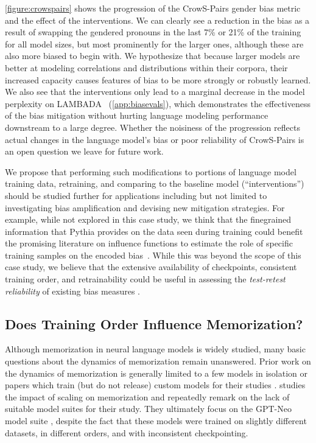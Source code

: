 \documentclass{article}
\theoremstyle{plain}
\theoremstyle{definition}
\theoremstyle{remark}
\begin{document}
\cref{figure:crowspairs} shows the progression of the CrowS-Pairs gender bias metric and the effect of the interventions. We can clearly see a reduction in the bias as a result of swapping the gendered pronouns in the last 7\% or 21\% of the training for all model sizes, but most prominently for the larger ones, although these are also more biased to begin with. We hypothesize that because larger models are better at modeling correlations and distributions within their corpora, their increased capacity causes features of bias to be more strongly or robustly learned.
We also see that the interventions only lead to a marginal decrease in the model perplexity on LAMBADA~\citep{paperno2016lambada} (\cref{app:biasevals}), which demonstrates the effectiveness of the bias mitigation without hurting language modeling performance downstream to a large degree.
Whether the noisiness of the progression reflects actual changes in the language model's bias or poor reliability of CrowS-Pairs is an open question we leave for future work.



We propose that performing such modifications to portions of language model training data, retraining, and comparing to the baseline model (``interventions'') should be studied further for applications including but not limited to investigating bias amplification and devising new mitigation strategies.
For example, while not explored in this case study, we think that the finegrained information that Pythia provides on the data seen during training could benefit the promising literature on influence functions to estimate the role of specific training samples on the encoded bias~\citep{brunet2019understanding,silva2022cross}.
While this was beyond the scope of this case study, we believe that the extensive availability of checkpoints, consistent training order, and retrainability could be useful in assessing the \textit{test-retest reliability} of existing bias measures \citep{van2022undesirable}.



\subsection{Does Training Order Influence Memorization?}

Although memorization in neural language models is widely studied, many basic questions about the dynamics of memorization remain unanswered. Prior work on the dynamics of memorization is generally limited to a few models in isolation \citep{jagielski2022measuring,elazar2022measuring} or papers which train (but do not release) custom models for their studies \citep{tirumala2022memorization,hernandez2022scaling}. \citet{carlini2022quantifying} studies the impact of scaling on memorization and repeatedly remark on the lack of suitable model suites for their study. They ultimately focus on the GPT-Neo model suite \citep{black2021gpt,gpt-j,black2022gpt}, despite the fact that these models were trained on slightly different datasets, in different orders, and with inconsistent checkpointing. 
\end{document}

